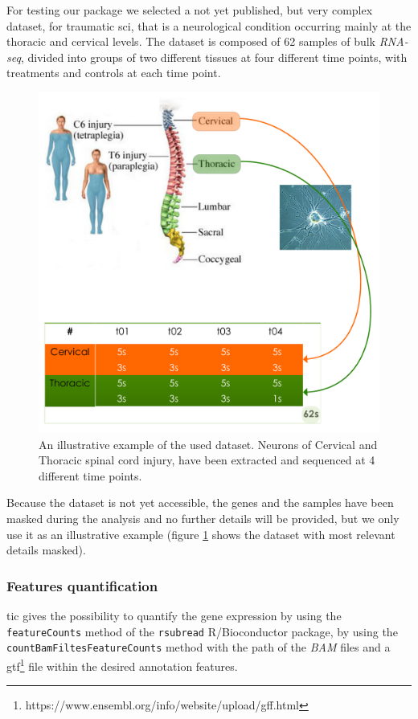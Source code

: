For testing our package we selected a not yet published, but very complex dataset, for traumatic \gls{sci}, that is a neurological condition occurring mainly at the thoracic and cervical levels.
The dataset is composed of 62 samples of bulk \textit{RNA-seq}, divided into groups of two different tissues at four different time points, with treatments and controls at each time point.

\begin{figure}[H]
\centering
\includegraphics[width=\textwidth, keepaspectratio]{img/ticorser/dataset.pdf}
\caption[ticorser dataset]{An illustrative example of the used dataset. Neurons of Cervical and Thoracic spinal cord injury, have been extracted and sequenced at 4 different time points.}
\label{fig:ticorserdataset}

\end{figure}

Because the dataset is not yet accessible, the genes and the samples have been masked during the analysis and no further details will be provided, but we only use it as an illustrative example (figure \ref{fig:ticorserdataset} shows the dataset with most relevant details masked).

\subsubsection{Features quantification}
\gls{tic} gives the possibility to quantify the gene expression by using the \lstinline!featureCounts! method of the \lstinline!rsubread! R/Bioconductor package, by using the \lstinline!countBamFiltesFeatureCounts! method with the path of the \textit{BAM} files and a \gls{gtf}\footnote{https://www.ensembl.org/info/website/upload/gff.html} file within the desired annotation features.

